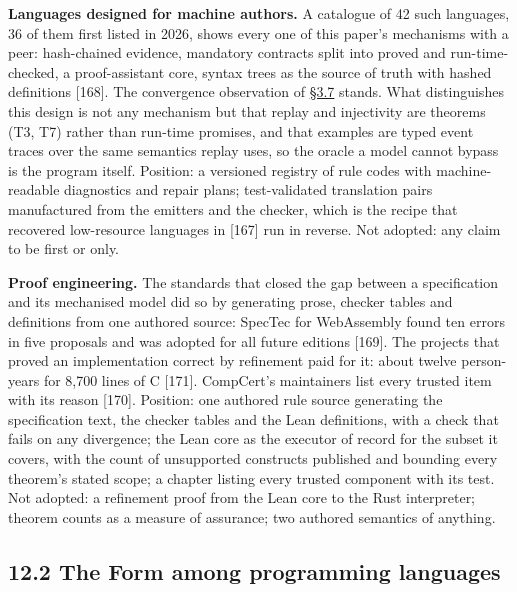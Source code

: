 \documentclass[10pt,letterpaper]{article}
\begin{document}
\textbf{Languages designed for machine authors.} A catalogue of 42 such
languages, 36 of them first listed in 2026, shows every one of this
paper's mechanisms with a peer: hash-chained evidence, mandatory
contracts split into proved and run-time-checked, a proof-assistant
core, syntax trees as the source of truth with hashed definitions
{[}168{]}. The convergence observation of
\href{https://research.openie.dev/papers/rce/\#37-the-language-one-text-costs-and-theorem-status}{§3.7}
stands. What distinguishes this design is not any mechanism but that
replay and injectivity are theorems (T3, T7) rather than run-time
promises, and that examples are typed event traces over the same
semantics replay uses, so the oracle a model cannot bypass is the
program itself. Position: a versioned registry of rule codes with
machine-readable diagnostics and repair plans; test-validated
translation pairs manufactured from the emitters and the checker, which
is the recipe that recovered low-resource languages in {[}167{]} run in
reverse. Not adopted: any claim to be first or only.

\textbf{Proof engineering.} The standards that closed the gap between a
specification and its mechanised model did so by generating prose,
checker tables and definitions from one authored source: SpecTec for
WebAssembly found ten errors in five proposals and was adopted for all
future editions {[}169{]}. The projects that proved an implementation
correct by refinement paid for it: about twelve person-years for 8,700
lines of C {[}171{]}. CompCert's maintainers list every trusted item
with its reason {[}170{]}. Position: one authored rule source generating
the specification text, the checker tables and the Lean definitions,
with a check that fails on any divergence; the Lean core as the executor
of record for the subset it covers, with the count of unsupported
constructs published and bounding every theorem's stated scope; a
chapter listing every trusted component with its test. Not adopted: a
refinement proof from the Lean core to the Rust interpreter; theorem
counts as a measure of assurance; two authored semantics of anything.

\subsection{12.2 The Form among programming
languages}\label{the-form-among-programming-languages}
\end{document}
